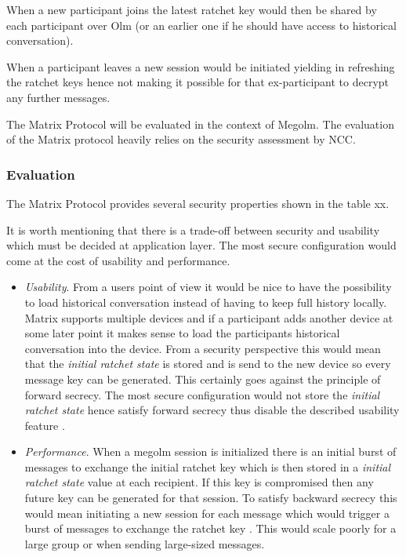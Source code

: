 When a new participant joins the latest ratchet key would then be shared by each participant over Olm (or an earlier one if he should have access to historical conversation). 

When a participant leaves a new session would be initiated yielding in refreshing the ratchet keys hence not making it possible for that ex-participant to decrypt any further messages.





The Matrix Protocol will be evaluated in the context of Megolm. The evaluation of the Matrix protocol heavily relies on the security assessment by NCC.


\subsubsection{Evaluation}

The Matrix Protocol provides several security properties shown in the table xx. 

It is worth mentioning that there is a trade-off between security and usability which must be decided at application layer. The most secure configuration would come at the cost of usability and performance.    
\begin{itemize}
	\item \emph{Usability}. From a users point of view it would be nice to have the possibility to load historical conversation instead of having to keep full history locally. Matrix supports multiple devices and if a participant adds another device at some later point it makes sense to load the participants historical conversation into the device. From a security perspective this would mean that the \emph{initial ratchet state} is stored and is send to the new device so every message key can be generated. This certainly goes against the principle of forward secrecy. The most secure configuration would not store the \emph{initial ratchet state} hence satisfy forward secrecy thus disable the described usability feature \cite{ncc} \cite{megolm}.
	\item \emph{Performance}. When a megolm session is initialized there is an initial burst of messages to exchange the initial ratchet key which is then stored in a \emph{initial ratchet state} value at each recipient. If this key is compromised then any future key can be generated for that session. To satisfy backward secrecy this would mean initiating a new session for each message which would trigger a burst of messages to exchange the ratchet key \cite{ncc} \cite{megolm}. This would scale poorly for a large group or when sending large-sized messages. 
\end{itemize} 


